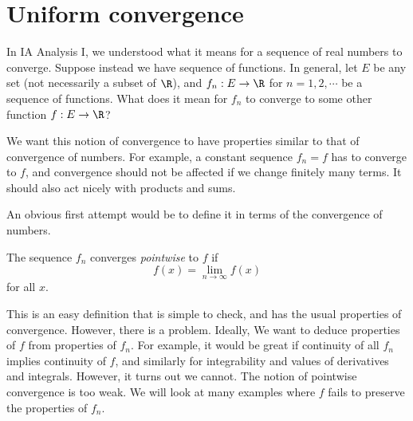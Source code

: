 \documentclass[a4paper]{article}
\begin{document}
\section{Uniform convergence}
In IA Analysis I, we understood what it means for a sequence of real numbers to converge. Suppose instead we have sequence of functions. In general, let $E$ be any set (not necessarily a subset of $\R$), and $f_n: E\to \R$ for $n = 1, 2, \cdots$ be a sequence of functions. What does it mean for $f_n$ to converge to some other function $f: E \to \R$?

We want this notion of convergence to have properties similar to that of convergence of numbers. For example, a constant sequence $f_n = f$ has to converge to $f$, and convergence should not be affected if we change finitely many terms. It should also act nicely with products and sums.

An obvious first attempt would be to define it in terms of the convergence of numbers.
\begin{defi}
  The sequence $f_n$ converges \emph{pointwise} to $f$ if
  \[
    f(x) = \lim_{n\to \infty} f(x)
  \]
  for all $x$.
\end{defi}
This is an easy definition that is simple to check, and has the usual properties of convergence. However, there is a problem. Ideally, We want to deduce properties of $f$ from properties of $f_n$. For example, it would be great if continuity of all $f_n$ implies continuity of $f$, and similarly for integrability and values of derivatives and integrals. However, it turns out we cannot. The notion of pointwise convergence is too weak. We will look at many examples where $f$ fails to preserve the properties of $f_n$.
\end{document}
